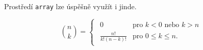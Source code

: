 \documentclass[a4paper, 11pt, twocolumn]{article}
\theoremstyle{definition}
\begin{document}
Prostředí \verb!array! lze úspěšně využít i jinde.

\begin{equation*}
\binom{n}{k} =
\begin{cases}
{\begin{array}{cl}
0 & \text{pro $k < 0$ nebo $k > n$}\\
\frac{n!}{k!(n-k)!} & \text{pro $0 \leq k \leq n$.}
\end{array} } 
\end{cases}
\end{equation*}
\end{document}
